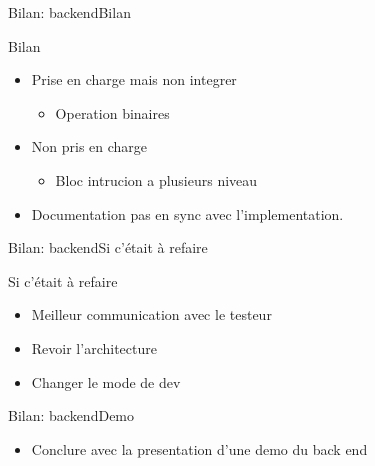	\begin{frame}{Bilan: backend}{Bilan}
    	\begin{block}{Bilan}
    		\begin{itemize}
				\item<1-> Prise en charge mais non integrer
				\begin{itemize}
					\item<2-> Operation binaires
				\end{itemize}

				\item<3-> Non pris en charge
				\begin{itemize}
					\item<4-> Bloc intrucion a plusieurs niveau
				\end{itemize}

				\item<5-> Documentation pas en sync avec l'implementation.
	    	\end{itemize}
	    \end{block}
    \end{frame}

    \begin{frame}{Bilan: backend}{Si c'était à refaire}
    	\begin{block}{Si c'était à refaire}
	    	\begin{itemize}
	    		\item<1-> Meilleur communication avec le testeur
				\item<2-> Revoir l'architecture
				\item<3-> Changer le mode de dev
	    	\end{itemize}
	    \end{block}
    \end{frame}

	\begin{frame}{Bilan: backend}{Demo}
    	\begin{itemize}
    		\item<1-> Conclure avec la presentation d'une demo du back end
    	\end{itemize}
    \end{frame}

